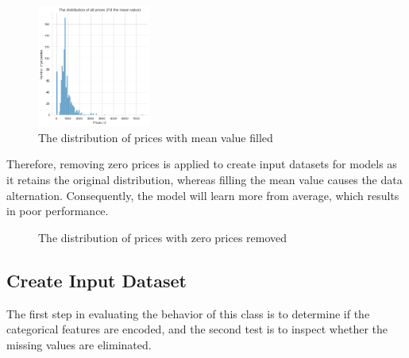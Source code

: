 \documentclass[12pt,twoside]{report}
\begin{document}
\begin{figure}[!htbp]
	\centering
	\includegraphics[height=4cm]{price_all_mean}
	\caption{The distribution of prices with mean value filled}
	\label{price_filled}
\end{figure}

Therefore, removing zero prices is applied to create input datasets for models as it retains the original distribution, whereas filling the mean value causes the data alternation. Consequently, the model will learn more from average, which results in poor performance. 

\begin{figure}[h]
	\centering
	\hfil
	\caption{The distribution of prices with zero prices removed}
	\label{price_removed}
\end{figure}

\subsection{Create Input Dataset}
The first step in evaluating the behavior of this class is to determine if the categorical features are encoded, and the second test is to inspect whether the missing values are eliminated.
\\
\end{document}

